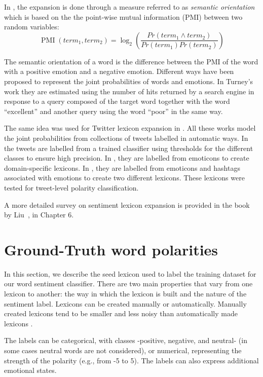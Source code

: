 \documentclass{sig-alternate}
\begin{document}
In \cite{Turney2002, turney2003measuring}, the expansion is done through a measure referred to as \emph{semantic orientation} which is based on the the point-wise mutual information (PMI) between two random variables:
\begin{equation}
 \operatorname{PMI}(term_{1}, term_{2})= \log_{2} \left ( \frac{Pr(term_{1} \wedge term_{2})}{Pr(term_{1})Pr(term_{2})} \right )
\end{equation}

The semantic orientation of a word is the difference between the PMI of the word with a positive emotion and a negative emotion. Different ways have been proposed to represent the joint probabilities of words and emotions. In Turney's work \cite{Turney2002} they are estimated using the number of hits returned by a search engine in response to a query composed of the target word together with the word ``excellent'' and another query using the word ``poor'' in the same way.  

The same idea was used for Twitter lexicon expansion in \cite{avaya2013, Mohammad2013,   Zhou2014}. All these works model the joint probabilities from collections of tweets labelled in automatic ways. In \cite{avaya2013} the tweets are labelled from a trained classifier using thresholds for the different classes to ensure high precision. In \cite{Zhou2014}, they are labelled from emoticons to create domain-specific lexicons. In \cite{Mohammad2013}, they are labelled from emoticons and hashtags associated with emotions to create two different lexicons. These lexicons were tested for tweet-level polarity classification. 

A more detailed survey on sentiment lexicon expansion is provided in the book by Liu~\cite{LiuBook}, in Chapter 6. 


\section{Ground-Truth word polarities}\label{sec:seed_lex}
In this section, we describe the seed lexicon used to label the training dataset for our word sentiment classifier. There are two main properties that vary from one lexicon to another: the way in which the lexicon is built and the nature of the sentiment label. Lexicons can be created manually or automatically. Manually created lexicons tend to be smaller and less noisy than automatically made lexicons \cite{BravoMarquez2014}. 

 The labels can be categorical, with classes -positive, negative, and neutral- (in some cases neutral words are not considered), or numerical, representing the strength of the polarity (e.g., from -5 to 5). The labels can also express additional emotional states.
\end{document}
